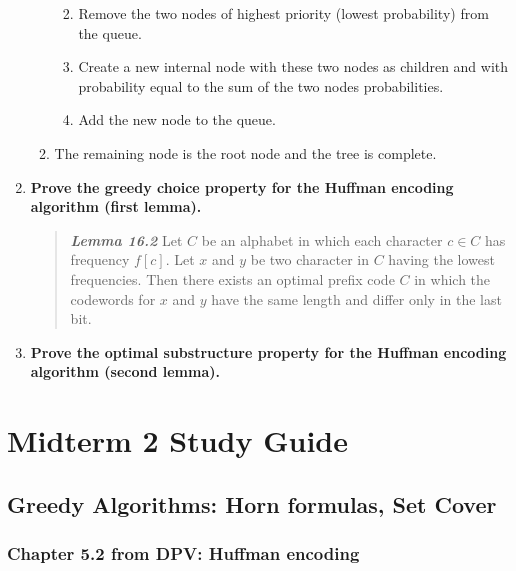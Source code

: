 \documentclass[a4paper,11pt]{article}
\begin{document}
\begin{enumerate}
\begin{enumerate}
    \begin{enumerate}
    \def\labelenumiii{\arabic{enumiii}.}
    \itemsep1pt\parskip0pt
    \item
      Remove the two nodes of highest priority (lowest probability) from
      the queue.
    \item
      Create a new internal node with these two nodes as children and
      with probability equal to the sum of the two nodes probabilities.
    \item
      Add the new node to the queue.
    \end{enumerate}
  \item
    The remaining node is the root node and the tree is complete.
  \end{enumerate}
\item
  \textbf{Prove the greedy choice property for the Huffman encoding
  algorithm (first lemma).}

  \begin{quote}
  \textbf{\emph{Lemma 16.2}} Let $C$ be an alphabet in which each
  character $c \in C$ has frequency $f[c]$. Let $x$ and $y$ be two
  character in $C$ having the lowest frequencies. Then there exists an
  optimal prefix code $C$ in which the codewords for $x$ and $y$ have
  the same length and differ only in the last bit.
  \end{quote}
\item
  \textbf{Prove the optimal substructure property for the Huffman
  encoding algorithm (second lemma).}
\end{enumerate}

\section{Midterm 2 Study Guide}\label{midterm-2-study-guide}

\subsection{Greedy Algorithms: Horn formulas, Set
Cover}\label{greedy-algorithms-horn-formulas-set-cover}

\subsubsection{Chapter 5.2 from DPV: Huffman
encoding}\label{chapter-5.2-from-dpv-huffman-encoding-1}
\end{document}
